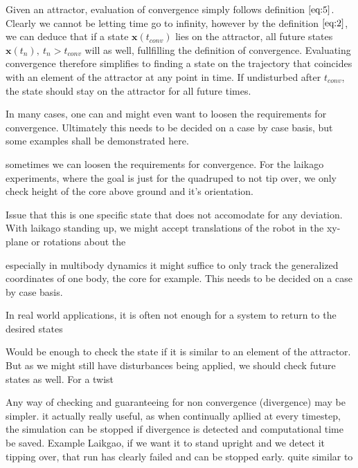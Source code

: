    Given an attractor, evaluation of convergence simply follows definition $\ref{eq:5}$. Clearly we cannot be letting time go to infinity, however by the definition $\ref{eq:2}$, we can deduce that if a state $\mathbf{x}(t_{conv})$ lies on the attractor, all future states $\mathbf{x}(t_n),\ t_n > t_{conv}$ will as well, fullfilling the definition of convergence. 
 Evaluating convergence therefore simplifies to finding a state on the trajectory that coincides with an element of the attractor at any point in time. If undisturbed after $t_{conv}$, the state should stay on the attractor for all future times. 

    In many cases, one can and might even want to loosen the requirements for convergence. Ultimately this needs to be decided on a case by case basis, but some examples shall be demonstrated here.  
    
    sometimes we can loosen the requirements for convergence. For the laikago experiments, where the goal is just for the quadruped to not tip over, we only check height of the core above ground and it's orientation. 
    
    Issue that this is one specific state that does not accomodate for any deviation. With laikago standing up, we might accept translations of the robot in the xy-plane or rotations about the 

    especially in multibody dynamics it might suffice to only track the generalized coordinates of one body, the core for example. This needs to be decided on a case by case basis. 

    In real world applications, it is often not enough for a system to return to the desired states 

    Would be enough to check the state if it is similar to an element of the attractor. But as we might still have disturbances being applied, we should check future states as well. For a twist

    Any way of checking and guaranteeing for non convergence (divergence) may be simpler. it actually really useful, as when continually apllied at every timestep, the simulation can be stopped if divergence is detected and computational time be saved. Example Laikgao, if we want it to stand upright and we detect it tipping over, that run has clearly failed and can be stopped early. 
    quite similar to 



